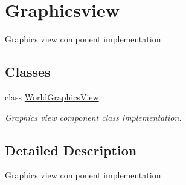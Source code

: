 \hypertarget{group__graphicsview}{}\section{Graphicsview}
\label{group__graphicsview}


Graphics view component implementation.  


\subsection*{Classes}
\begin{DoxyCompactItemize}
\item 
class \hyperlink{classWorldGraphicsView}{World\+Graphics\+View}
\begin{DoxyCompactList}\small\item\em Graphics view component class implementation. \end{DoxyCompactList}\end{DoxyCompactItemize}


\subsection{Detailed Description}
Graphics view component implementation. 

